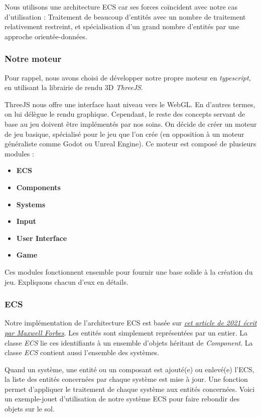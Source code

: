     Nous utilisons une architecture ECS car ses forces coïncident avec notre cas d'utilisation : Traitement de beaucoup d'entités avec un nombre de traitement relativement restreint, et spécialisation d'un grand nombre d'entités par une approche orientée-données.


\subsubsection{Notre moteur}
    Pour rappel, nous avons choisi de développer notre propre moteur en \textit{typescript}, en utilisant la librairie de rendu 3D \textit{ThreeJS}.

    ThreeJS nous offre une interface haut niveau vers le WebGL. En d'autres termes, on lui délègue le rendu graphique. Cependant, le reste des concepts servant de base au jeu doivent être implémentés par nos soins. On décide de créer un moteur de jeu basique, spécialisé pour le jeu que l'on crée (en opposition à un moteur généraliste comme Godot ou Unreal Engine). Ce moteur est composé de plusieurs modules :
    
\begin{itemize}
    \item \textbf{ECS}
    \item \textbf{Components}
    \item \textbf{Systems}
    \item \textbf{Input}
    \item \textbf{User Interface}
    \item \textbf{Game}
\end{itemize} 

    Ces modules fonctionnent ensemble pour fournir une base solide à la création du jeu. Expliquons chacun d'eux en détails.
\subsubsection{ECS}
    Notre implémentation de l'architecture ECS est basée sur \href{https://maxwellforbes.com/posts/typescript-ecs-implementation/}{\textit{cet article de 2021 écrit par Maxwell Forbes}}. Les entités sont simplement représentées par un entier. La classe \textit{ECS} lie ces identifiants à un ensemble d'objets héritant de \textit{Component}. La classe \textit{ECS} contient aussi l'ensemble des systèmes.
    
    Quand un système, une entité ou un composant est ajouté(e) ou enlevé(e) l'ECS, la liste des entités concernées par chaque système est mise à jour.
    Une fonction permet d'appliquer le traitement de chaque système aux entités concernées. Voici un exemple-jouet d'utilisation de notre système ECS pour faire rebondir des objets sur le sol.

